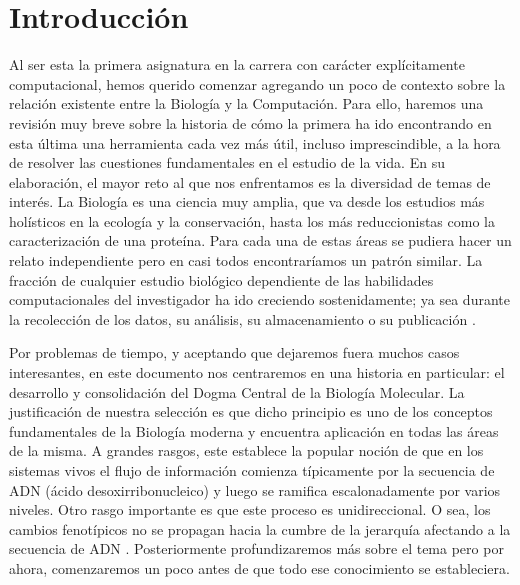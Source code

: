 \section{Introducción}
 
Al ser esta la primera asignatura en la carrera con carácter explícitamente computacional, hemos querido comenzar agregando un poco de contexto sobre la relación existente entre la Biología y la Computación.
Para ello, haremos una revisión muy breve sobre la historia de cómo la primera ha ido encontrando en esta última una herramienta cada vez más útil, incluso imprescindible, a la hora de resolver las cuestiones fundamentales en el estudio de la vida.
En su elaboración, el mayor reto al que nos enfrentamos es la diversidad de temas de interés.
La Biología es una ciencia muy amplia, que va desde los estudios más holísticos en la ecología y la conservación, hasta los más reduccionistas como la caracterización de una proteína.
Para cada una de estas áreas se pudiera hacer un relato independiente pero en casi todos encontraríamos un patrón similar.
La fracción de cualquier estudio biológico dependiente de las habilidades computacionales del investigador ha ido creciendo sostenidamente; ya sea durante la recolección de los datos, su análisis, su almacenamiento o su publicación \cite{gauthierBriefHistoryBioinformatics2019, cameronBriefHistorySynthetic2014}.
 
 
Por problemas de tiempo, y aceptando que dejaremos fuera muchos casos interesantes, en este documento nos centraremos en una historia en particular: el desarrollo y consolidación del Dogma Central de la Biología Molecular.
La justificación de nuestra selección es que dicho principio es uno de los conceptos fundamentales de la Biología moderna y encuentra aplicación en todas las áreas de la misma.
A grandes rasgos, este establece la popular noción de que en los sistemas vivos el flujo de información comienza típicamente por la secuencia de ADN (ácido desoxirribonucleico) y luego se ramifica escalonadamente por varios niveles.
Otro rasgo importante es que este proceso es unidireccional.
O sea, los cambios fenotípicos no se propagan hacia la cumbre de la jerarquía afectando a la secuencia de ADN \cite{crickCentralDogmaMolecular1970}.
Posteriormente profundizaremos más sobre el tema pero por ahora, comenzaremos un poco antes de que todo ese conocimiento se estableciera.
